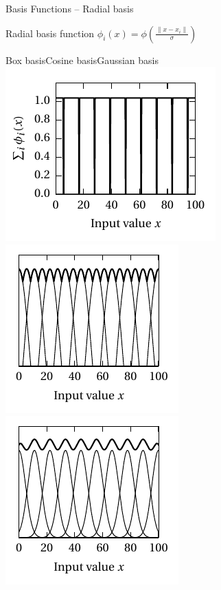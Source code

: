 \documentclass[aspectratio=169]{beamer}
\begin{document}
\begin{frame}{Basis Functions -- Radial basis}

\centering

Radial basis function $\phi_i(x) = \phi\left(\frac{\| x - x_i \|}{\sigma}\right)$

\vspace{0.5cm}

{\color{violet}\hspace{1cm}Box basis\hspace{1.9cm}Cosine basis\hspace{1.6cm}Gaussian basis}\\
\includegraphics[scale=0.85]{../media/basis_box.pdf}
\includegraphics[scale=0.85]{../media/basis_cosine.pdf}
\includegraphics[scale=0.85]{../media/basis_gaussian.pdf}


\end{frame}
\end{document}
